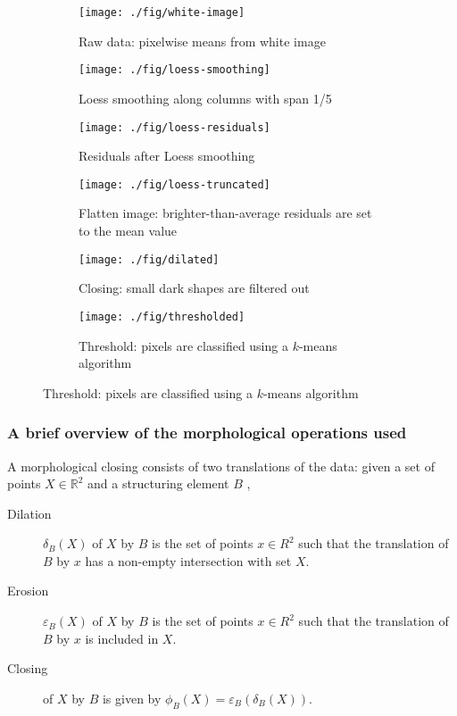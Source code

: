 \documentclass[10pt,fleqn]{article}
\begin{document}
\begin{figure}[!ht]		%
\caption{Stages in identification of spots on beryllium screen}
\centering

\captionsetup[subfigure]{position=t}

\begin{subfigure}[b]{0.32\textwidth}
\caption{Raw data: pixelwise means from white image}
\texttt{[image: ./fig/white-image]}
\end{subfigure}
%
\begin{subfigure}[b]{0.32\textwidth}
\caption{Loess smoothing along columns with span 1/5}
\texttt{[image: ./fig/loess-smoothing]}
\end{subfigure}
%
\begin{subfigure}[b]{0.32\textwidth}
\caption{Residuals after Loess smoothing \\}
\texttt{[image: ./fig/loess-residuals]}
\end{subfigure}
%
\par\bigskip
%
\begin{subfigure}[b]{0.32\textwidth}
\caption{Flatten image: brighter-than-average residuals are set to the mean value}
\texttt{[image: ./fig/loess-truncated]}
\end{subfigure}
%
\begin{subfigure}[b]{0.32\textwidth}
\caption{Closing: small dark shapes are filtered out \\}
\texttt{[image: ./fig/dilated]}
\end{subfigure}
%
\begin{subfigure}[b]{0.32\textwidth}
\caption{Threshold: pixels are classified using a $k$-means algorithm \\}
\texttt{[image: ./fig/thresholded]}
\end{subfigure}
\end{figure}

\FloatBarrier
\subsubsection*{A brief overview of the morphological operations used}
A morphological closing consists of two translations of the data: given a set of points $X \in \mathbb{R}^2$ and a structuring element $B$ \cite{Vincent1997},

\begin{description}		%
\item[Dilation] $\delta_B(X)$ of $X$ by $B$ is the set of points $x \in R^2$ such that the translation of $B$ by $x$ has a non-empty intersection with set $X$.
\item[Erosion] $\varepsilon_B(X)$ of $X$ by $B$ is the set of points $x \in R^2$ such that the translation of $B$ by $x$ is included in $X$.
\item[Closing] of $X$ by $B$ is given by $\phi_B(X) = \varepsilon_B(\delta_B(X))$.
\end{description}
\end{document}
